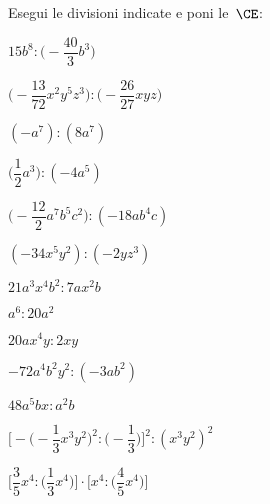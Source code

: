 \begin{esercizio}
 \label{ese:9.21}
Esegui le divisioni indicate e poni le~\(\CE\):
\begin{multicols}{2}
\begin{enumeratea}
\spazielenx
 \item \(15b^{8}:\bigg(-{\dfrac{40}{3}}b^{3}\bigg)\)
 \item 
\(\bigg(-{\dfrac{13}{72}}x^{2}y^{5}z^{3}\bigg):\bigg(-{\dfrac{26}{27}}xyz\bigg)\)
 \item \((-a^{7}):(8a^{7})\)
 \item \(\bigg(\dfrac{1}{2}a^{3}\bigg):(-4a^{5})\)
 \item \(\bigg(-{\dfrac{12}{2}}a^{7}b^{5}c^{2}\bigg):(-18ab^{4}c)\)
 \item \((-34x^{5}y^{2}):(-2yz^{3})\)
% 
 \item \(21a^{3}x^{4}b^{2}:7ax^{2}b\)
 \item \(a^{6}:20a^{2}\)
 \item \(20ax^{4}y:2xy\)
 \item \(-72a^{4}b^{2}y^{2}:(-3ab^{2})\)
% 
 \item \(48a^{5}bx:a^{2}b\)
 \item 
\(\Bigg[-\bigg(-{\dfrac{1}{3}}x^{3}y^{2}\bigg)^{2}:\bigg(-{\dfrac{1}{3}}
\bigg)\Bigg]^{2}:(x^{3}y^{2})^{2}\)
 \item 
\(\Bigg[\dfrac{3}{5}x^{4}:\bigg(\dfrac{1}{3}x^{4}\bigg)\Bigg]\cdot\Bigg[x^{4}
:\bigg(\dfrac{4}{5}x^{4}\bigg)\Bigg]\)
\end{enumeratea}
\end{multicols}
\end{esercizio}

